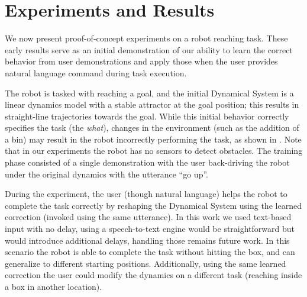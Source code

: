 \section{Experiments and Results}
\label{sec:results}

We now present proof-of-concept experiments on a robot reaching task.
These early results serve as an initial demonstration of our ability to learn the correct behavior from user demonstrations and apply those when the user provides natural language command during task execution.

The robot is tasked with reaching a goal, and the initial Dynamical System is a linear dynamics model with a stable attractor at the goal position; this results in straight-line trajectories towards the goal.
While this initial behavior correctly specifies the task (the \emph{what}), changes in the environment (such as the addition of a bin) may result in the robot incorrectly performing the task, as shown in .
Note that in our experiments the robot has no sensors to detect obstacles.
The training phase consisted of a single demonstration with the user back-driving the robot under the original dynamics with the utterance ``go up''.

During the experiment, the user (though natural language) helps the robot to complete the task correctly by reshaping the Dynamical System using the learned correction (invoked using the same utterance).
In this work we used text-based input with no delay, using a speech-to-text engine would be straightforward but would introduce additional delays, handling those remains future work.
In this scenario the robot is able to complete the task without hitting the box, and can generalize to different starting positions.
Additionally, using the same learned correction the user could modify the dynamics on a different task (reaching inside a box in another location).

